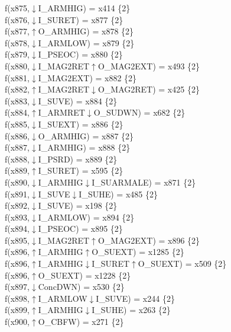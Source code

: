 f(x875,$\downarrow$I\_ARMHIG) = x414 \{2\} \\  
f(x876,$\downarrow$I\_SURET) = x877 \{2\} \\  
f(x877,$\uparrow$O\_ARMHIG) = x878 \{2\} \\  
f(x878,$\downarrow$I\_ARMLOW) = x879 \{2\} \\  
f(x879,$\downarrow$I\_PSEOC) = x880 \{2\} \\  
f(x880,$\downarrow$I\_MAG2RET$\uparrow$O\_MAG2EXT) = x493 \{2\} \\  
f(x881,$\downarrow$I\_MAG2EXT) = x882 \{2\} \\  
f(x882,$\uparrow$I\_MAG2RET$\downarrow$O\_MAG2RET) = x425 \{2\} \\  
f(x883,$\downarrow$I\_SUVE) = x884 \{2\} \\  
f(x884,$\uparrow$I\_ARMRET$\downarrow$O\_SUDWN) = x682 \{2\} \\  
f(x885,$\downarrow$I\_SUEXT) = x886 \{2\} \\  
f(x886,$\downarrow$O\_ARMHIG) = x887 \{2\} \\  
f(x887,$\downarrow$I\_ARMHIG) = x888 \{2\} \\  
f(x888,$\downarrow$I\_PSRD) = x889 \{2\} \\  
f(x889,$\uparrow$I\_SURET) = x595 \{2\} \\  
f(x890,$\downarrow$I\_ARMHIG$\downarrow$I\_SUARMALE) = x871 \{2\} \\  
f(x891,$\downarrow$I\_SUVE$\downarrow$I\_SUHE) = x485 \{2\} \\  
f(x892,$\downarrow$I\_SUVE) = x198 \{2\} \\  
f(x893,$\downarrow$I\_ARMLOW) = x894 \{2\} \\  
f(x894,$\downarrow$I\_PSEOC) = x895 \{2\} \\  
f(x895,$\downarrow$I\_MAG2RET$\uparrow$O\_MAG2EXT) = x896 \{2\} \\  
f(x896,$\uparrow$I\_ARMHIG$\uparrow$O\_SUEXT) = x1285 \{2\} \\  
f(x896,$\uparrow$I\_ARMHIG$\downarrow$I\_SURET$\uparrow$O\_SUEXT) = x509 \{2\} \\  
f(x896,$\uparrow$O\_SUEXT) = x1228 \{2\} \\  
f(x897,$\downarrow$ConcDWN) = x530 \{2\} \\  
f(x898,$\uparrow$I\_ARMLOW$\downarrow$I\_SUVE) = x244 \{2\} \\  
f(x899,$\uparrow$I\_ARMHIG$\downarrow$I\_SUHE) = x263 \{2\} \\  
f(x900,$\uparrow$O\_CBFW) = x271 \{2\} \\  
